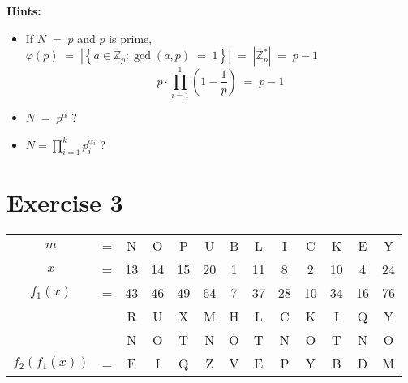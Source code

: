 \documentclass[a4paper]{scrreprt}
\newcommand\Z{\mathbb Z}
\renewcommand*{\arraystretch}{1.5}
\begin{document}
\textbf{Hints:}\begin{itemize}
    \item If $N\;=\;p$ and $p$ is prime, $\varphi(p)\;=\;\left|\left\{a\in\Z_p:\gcd(a,p)\;=\;1\right\}\right|\;=\;|\Z_p^*|\;=\;p-1$
        \[p\cdot\prod_{i=1}^1\left(1-\frac 1 p\right)\;=\;p-1\]
    \item $N\;=\;p^\alpha$ ?
    \item $N=\prod_{i=1}^k p_i^{\alpha_i}$ ?
\end{itemize}


\section*{Exercise 3}

\begin{center}
    \renewcommand*{\arraystretch}{1}
    \begin{tabular}{ccccccccccccc}
        $m$&=&N&O&P&U&B&L&I&C&K&E&Y\\
        $x$&=&13&14&15&20&1&11&8&2&10&4&24\\
        $f_1(x)$&=&43&46&49&64&7&37&28&10&34&16&76\\
        &&R&U&X&M&H&L&C&K&I&Q&Y\\
        &&N&O&T&N&O&T&N&O&T&N&O\\
        $f_2(f_1(x))$&=&E&I&Q&Z&V&E&P&Y&B&D&M
    \end{tabular}
\end{center}
\end{document}

